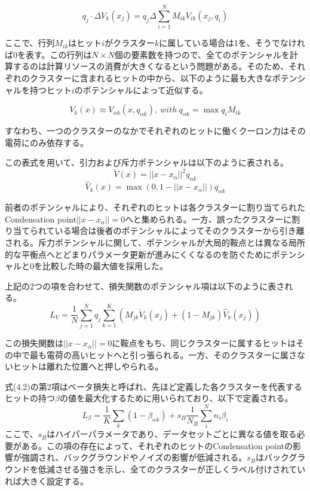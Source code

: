 \begin{equation}
q_j \cdot \Delta V_k(x_j) = q_j \Delta \sum_{i=1}^{N} M_{ik} V_{ik} (x_j ,q_i)
\end{equation}

ここで、行列$M_{ik}$はヒット$i$がクラスター$k$に属している場合は1を、そうでなければ0を表す。この行列は$N\times N$個の要素数を持つので、全てのポテンシャルを計算するのは計算リソースの消費が大きくなるという問題がある。そのため、それぞれのクラスターに含まれるヒットの中から、以下のように最も大きなポテンシャルを持つヒット$i$のポテンシャルによって近似する。

\begin{equation}
V_k(x) \approx V_{\alpha k}(x, q_{\alpha k}),\  with\ q_{\alpha k} = \max q_i M_{ik}  
\end{equation}

すなわち、一つのクラスターのなかでそれぞれのヒットに働くクーロン力はその電荷にのみ依存する。

この表式を用いて、引力および斥力ポテンシャルは以下のように表される。
\begin{equation}
\check{V}(x) = ||x-x_{\alpha} ||^2 q_{\alpha k}
\end{equation}
\begin{equation}
\hat{V}_{k}(x) = \max(0,1-||x-x_\alpha ||)q_{\alpha k}
\end{equation}

前者のポテンシャルにより、それぞれのヒットは各クラスターに割り当てられた Condensation point$||x-x_{\alpha}||=0$へと集められる。一方、誤ったクラスターに割り当てられている場合は後者のポテンシャルによってそのクラスターから引き離される。斥力ポテンシャルに関して、ポテンシャルが大局的鞍点とは異なる局所的な平衡点へとどまりパラメータ更新が進みにくくなるのを防ぐためにポテンシャルと0を比較した時の最大値を採用した。

上記の2つの項を合わせて、損失関数のポテンシャル項は以下のように表される。
\begin{equation}
L_V = \frac{1}{N}\sum_{j=1}^{N} q_j \sum_{k=1}^K \left(M_{jk} \check{V}_k(x_j) + (1 - M_{jk})\hat{V}_k(x_j)\right)
\end{equation}

この損失関数は$||x-x_{\alpha}|| = 0$に鞍点をもち、同じクラスターに属するヒットはその中で最も電荷の高いヒットへと引っ張られる。一方、そのクラスターに属さないヒットは離れた位置へと押しやられる。

式(4.2)の第2項はベータ損失と呼ばれ、先ほど定義した各クラスターを代表するヒットの持つ$\beta$の値を最大化するために用いられており、以下で定義される。
\begin{equation}
L_\beta = \frac{1}{K}\sum_k (1-\beta_{\alpha k}) +s_B \frac{1}{N_B}\sum_i^N n_i \beta_i
\end{equation}
ここで、$s_B$はハイパーパラメータであり、データセットごとに異なる値を取る必要がある。この項の存在によって、それぞれのヒットのCondensation pointの影響が強調され、バックグラウンドやノイズの影響が低減される。$s_B$はバックグラウンドを低減させる強さを示し、全てのクラスターが正しくラベル付けされていれば大きく設定する。


